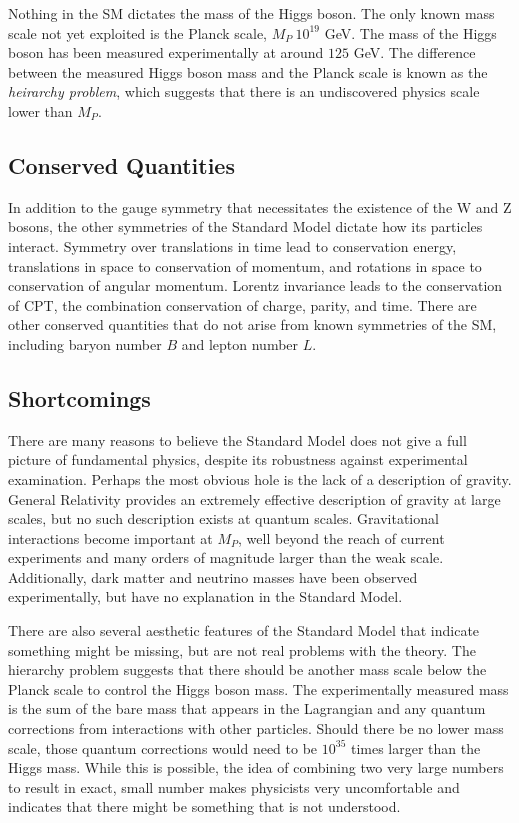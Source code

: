 Nothing in the \ac{SM} dictates the mass of the Higgs boson. The only known mass scale not yet exploited is the Planck scale, $M_P ~{} 10^{19}$ GeV. The mass of the Higgs boson has been measured experimentally at around $125$ GeV. The difference between the measured Higgs boson mass and the Planck scale is known as the \emph{heirarchy problem}, which suggests that there is an undiscovered physics scale lower than $M_P$. 


\subsection{Conserved Quantities}

In addition to the gauge symmetry that necessitates the existence of the W and Z bosons, the other symmetries of the Standard Model dictate how its particles interact. Symmetry over translations in time lead to conservation energy, translations in space to conservation of momentum, and rotations in space to conservation of angular momentum. Lorentz invariance leads to the conservation of CPT, the combination conservation of charge, parity, and time. There are other conserved quantities that do not arise from known symmetries of the \ac{SM}, including baryon number $B$ and lepton number $L$. 


\subsection{Shortcomings}
There are many reasons to believe the Standard Model does not give a full picture of fundamental physics, despite its robustness against experimental examination. Perhaps the most obvious hole is the lack of a description of gravity. General Relativity provides an extremely effective description of gravity at large scales, but no such description exists at quantum scales. Gravitational interactions become important at $M_P$, well beyond the reach of current experiments and many orders of magnitude larger than the weak scale. Additionally, dark matter and neutrino masses have been observed experimentally, but have no explanation in the Standard Model. 

There are also several aesthetic features of the Standard Model that indicate something might be missing, but are not real problems with the theory. The hierarchy problem suggests that there should be another mass scale below the Planck scale to control the Higgs boson mass. The experimentally measured mass is the sum of the bare mass that appears in the Lagrangian and any quantum corrections from interactions with other particles. Should there be no lower mass scale, those quantum corrections would need to be $10^{35}$ times larger than the Higgs mass. While this is possible, the idea of combining two very large numbers to result in exact, small number makes physicists very uncomfortable and indicates that there might be something that is not understood.


